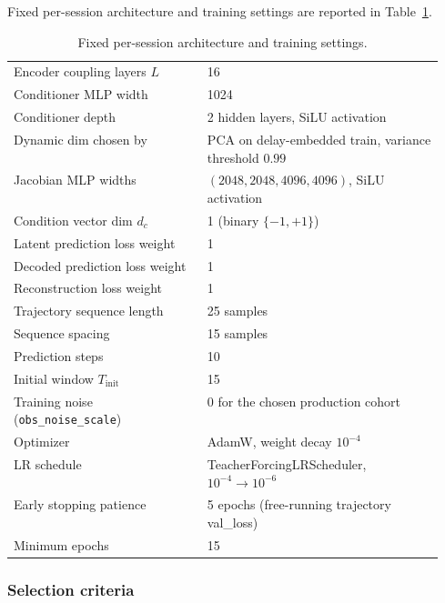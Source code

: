 Fixed per-session architecture and training settings are reported in Table~\ref{tab:supp-interareal-control-fixedconfig}.

\begin{table}[h!]
\centering
\small
\caption[Fixed architecture and training settings]{Fixed per-session architecture and training settings.}
\label{tab:supp-interareal-control-fixedconfig}
\begin{tabular}{lp{0.55\linewidth}}
\toprule
Encoder coupling layers $L$              & 16 \\
Conditioner MLP width                    & 1024 \\
Conditioner depth                        & 2 hidden layers, SiLU activation \\
Dynamic dim chosen by                    & PCA on delay-embedded train, variance threshold $0.99$ \\
Jacobian MLP widths                      & $(2048, 2048, 4096, 4096)$, SiLU activation \\
Condition vector dim $d_{c}$             & 1 (binary $\{-1,+1\}$) \\
Latent prediction loss weight            & 1 \\
Decoded prediction loss weight           & 1 \\
Reconstruction loss weight               & 1 \\
Trajectory sequence length               & 25 samples \\
Sequence spacing                         & 15 samples \\
Prediction steps                         & 10 \\
Initial window $T_{\mathrm{init}}$       & 15 \\
Training noise (\texttt{obs\_noise\_scale}) & $0$ for the chosen production cohort \\
Optimizer                                & AdamW, weight decay $10^{-4}$ \\
LR schedule                              & TeacherForcingLRScheduler, $10^{-4}\!\to\!10^{-6}$ \\
Early stopping patience                  & 5 epochs (free-running trajectory val\_loss) \\
Minimum epochs                           & 15 \\
\bottomrule
\end{tabular}
\end{table}

\subsubsection{Selection criteria}\label{supp:interareal-control-criteria}

